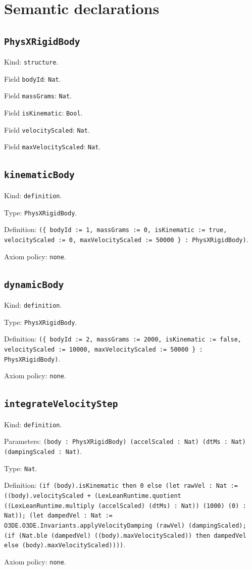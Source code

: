 \documentclass[11pt]{article}
\begin{document}
\section*{Semantic declarations}
\subsection*{\texttt{PhysXRigidBody}}
\noindent Kind: \texttt{structure}.\par
\noindent Field \texttt{bodyId}: \texttt{Nat}.\par
\noindent Field \texttt{massGrams}: \texttt{Nat}.\par
\noindent Field \texttt{isKinematic}: \texttt{Bool}.\par
\noindent Field \texttt{velocityScaled}: \texttt{Nat}.\par
\noindent Field \texttt{maxVelocityScaled}: \texttt{Nat}.\par
\subsection*{\texttt{kinematicBody}}
\noindent Kind: \texttt{definition}.\par
\noindent Type: \texttt{PhysXRigidBody}.\par
\noindent Definition: \texttt{(\{ bodyId := 1, massGrams := 0, isKinematic := true, velocityScaled := 0, maxVelocityScaled := 50000 \} : PhysXRigidBody)}.\par
\noindent Axiom policy: \texttt{none}.\par
\subsection*{\texttt{dynamicBody}}
\noindent Kind: \texttt{definition}.\par
\noindent Type: \texttt{PhysXRigidBody}.\par
\noindent Definition: \texttt{(\{ bodyId := 2, massGrams := 2000, isKinematic := false, velocityScaled := 10000, maxVelocityScaled := 50000 \} : PhysXRigidBody)}.\par
\noindent Axiom policy: \texttt{none}.\par
\subsection*{\texttt{integrateVelocityStep}}
\noindent Kind: \texttt{definition}.\par
\noindent Parameters: \texttt{(body : PhysXRigidBody) (accelScaled : Nat) (dtMs : Nat) (dampingScaled : Nat)}.\par
\noindent Type: \texttt{Nat}.\par
\noindent Definition: \texttt{(if (body).isKinematic then 0 else (let rawVel : Nat := ((body).velocityScaled + (LexLeanRuntime.quotient ((LexLeanRuntime.multiply (accelScaled) (dtMs) : Nat)) (1000) (0) : Nat)); (let dampedVel : Nat := O3DE.O3DE.Invariants.applyVelocityDamping (rawVel) (dampingScaled); (if (Nat.ble (dampedVel) ((body).maxVelocityScaled)) then dampedVel else (body).maxVelocityScaled))))}.\par
\noindent Axiom policy: \texttt{none}.\par
\end{document}
